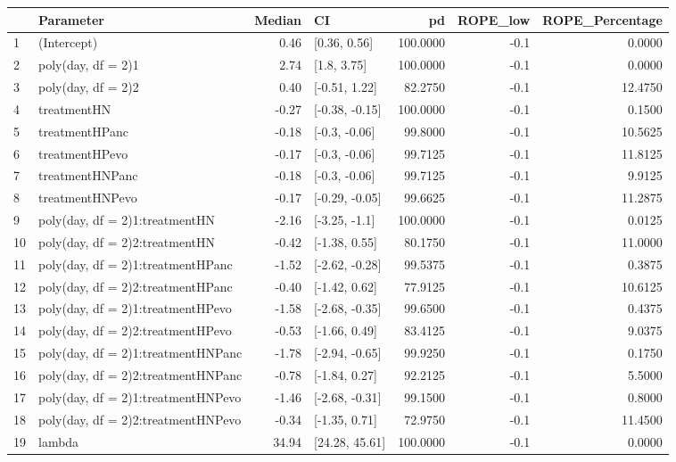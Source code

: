 \begin{table}[ht]
\centering
\begin{tabular}{llrlrrr}
  \hline
 & Parameter & Median & CI & pd & ROPE\_low & ROPE\_Percentage \\ 
  \hline
1 & (Intercept) & 0.46 & [0.36, 0.56] & 100.0000 & -0.1 & 0.0000 \\ 
  2 & poly(day, df = 2)1 & 2.74 & [1.8, 3.75] & 100.0000 & -0.1 & 0.0000 \\ 
  3 & poly(day, df = 2)2 & 0.40 & [-0.51, 1.22] & 82.2750 & -0.1 & 12.4750 \\ 
  4 & treatmentHN & -0.27 & [-0.38, -0.15] & 100.0000 & -0.1 & 0.1500 \\ 
  5 & treatmentHPanc & -0.18 & [-0.3, -0.06] & 99.8000 & -0.1 & 10.5625 \\ 
  6 & treatmentHPevo & -0.17 & [-0.3, -0.06] & 99.7125 & -0.1 & 11.8125 \\ 
  7 & treatmentHNPanc & -0.18 & [-0.3, -0.06] & 99.7125 & -0.1 & 9.9125 \\ 
  8 & treatmentHNPevo & -0.17 & [-0.29, -0.05] & 99.6625 & -0.1 & 11.2875 \\ 
  9 & poly(day, df = 2)1:treatmentHN & -2.16 & [-3.25, -1.1] & 100.0000 & -0.1 & 0.0125 \\ 
  10 & poly(day, df = 2)2:treatmentHN & -0.42 & [-1.38, 0.55] & 80.1750 & -0.1 & 11.0000 \\ 
  11 & poly(day, df = 2)1:treatmentHPanc & -1.52 & [-2.62, -0.28] & 99.5375 & -0.1 & 0.3875 \\ 
  12 & poly(day, df = 2)2:treatmentHPanc & -0.40 & [-1.42, 0.62] & 77.9125 & -0.1 & 10.6125 \\ 
  13 & poly(day, df = 2)1:treatmentHPevo & -1.58 & [-2.68, -0.35] & 99.6500 & -0.1 & 0.4375 \\ 
  14 & poly(day, df = 2)2:treatmentHPevo & -0.53 & [-1.66, 0.49] & 83.4125 & -0.1 & 9.0375 \\ 
  15 & poly(day, df = 2)1:treatmentHNPanc & -1.78 & [-2.94, -0.65] & 99.9250 & -0.1 & 0.1750 \\ 
  16 & poly(day, df = 2)2:treatmentHNPanc & -0.78 & [-1.84, 0.27] & 92.2125 & -0.1 & 5.5000 \\ 
  17 & poly(day, df = 2)1:treatmentHNPevo & -1.46 & [-2.68, -0.31] & 99.1500 & -0.1 & 0.8000 \\ 
  18 & poly(day, df = 2)2:treatmentHNPevo & -0.34 & [-1.35, 0.71] & 72.9750 & -0.1 & 11.4500 \\ 
  19 & lambda & 34.94 & [24.28, 45.61] & 100.0000 & -0.1 & 0.0000 \\ 
   \hline
\end{tabular}
\end{table}

